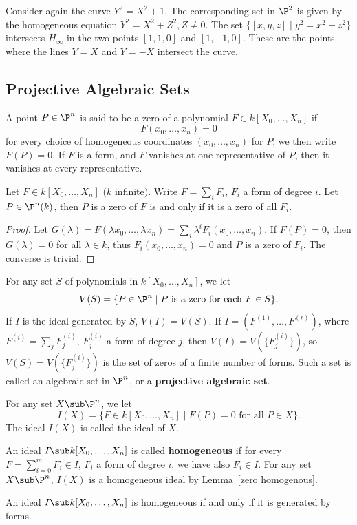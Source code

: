\begin{example}
Consider again the curve $Y^2=X^2+1$. The corresponding set in $\P^2$ is given by the homogeneous equation $Y^2=X^2+Z^2,Z\neq0$. The set $\{[x,y,z]\mid y^2=x^2+z^2\}$ intersects $H_\infty$ in the two points $[1,1,0]$ and $[1,-1,0]$. These are the points where the lines $Y=X$ and $Y=-X$ intersect the curve.
\end{example}
\subsection{Projective Algebraic Sets}
A point $P\in\P^n$ is said to be a zero of a polynomial $F\in k[X_0,\dots,X_n]$ if
\[F(x_0,\dots,x_n)=0\]
for every choice of homogeneous coordinates $(x_0,\dots,x_n)$ for $P$; we then write $F(P)=0$. If $F$ is a form, and $F$ vanishes at one representative of $P$, then it vanishes at every representative.
\begin{lemma}\label{zero homogenous}
Let $F\in k[X_0,\dots,X_n]$ $($$k$ infinite$)$. Write $F=\sum_iF_i$, $F_i$ a form of degree $i$. Let $P\in\P^n(k)$, then $P$ is a zero of $F$ is and only if it is a zero of all $F_i$.
\end{lemma}
\begin{proof}
Let $G(\lambda)=F(\lambda x_0,\dots,\lambda x_{n})=\sum_i\lambda^iF_i(x_0,\dots,x_n)$. If $F(P)=0$, then $G(\lambda)=0$ for all $\lambda\in k$, thus $F_i(x_0,\dots,x_n)=0$ and $P$ is a zero of $F_i$. The converse is trivial.
\end{proof}
For any set $S$ of polynomials in $k[X_0,\dots,X_n]$, we let
\[V(S)=\{P\in\P^n\mid\text{$P$ is a zero for each $F\in S$}\}.\]
If $I$ is the ideal generated by $S$, $V(I)=V(S)$. If $I=(F^{(1)},\dots,F^{(r)})$, where $F^{(i)}=\sum_jF^{(i)}_j$, $F^{(i)}_j$ a form of degree $j$, then $V(I)=V(\{F^{(i)}_j\})$, so $V(S)=V(\{F^{(i)}_j\})$ is the set of zeros of a finite number of forms. Such a set is called an algebraic set in $\P^n$, or a \textbf{projective algebraic set}.\par
For any set $X\sub\P^n$, we let 
\[I(X)=\{F\in k[X_0,\dots,X_n]\mid F(P)=0\text{ for all $P\in X$}\}.\] 
The ideal $I(X)$ is called the ideal of $X$.\par
An ideal $I\sub k[X_0,\dots,X_n]$ is called \textbf{homogeneous} if for every $F=\sum_{i=0}^{m}F_i\in I$, $F_i$ a form of degree $i$, we have also $F_i\in I$. For any set $X\sub\P^n$, $I(X)$ is a homogeneous ideal by Lemma~\ref{zero homogenous}.
\begin{proposition}
An ideal $I\sub k[X_0,\dots,X_n]$ is homogeneous if and only if it is generated by forms.
\end{proposition}
